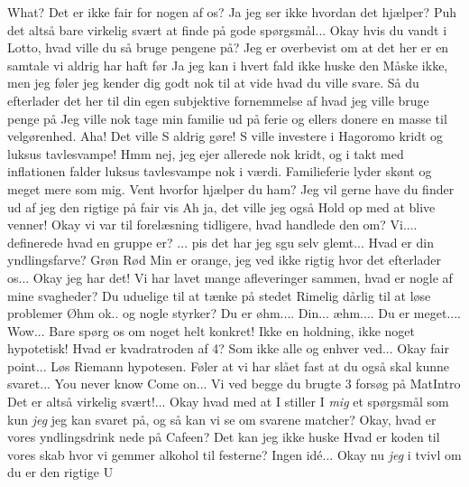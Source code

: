 \documentclass[a4paper,11pt]{article}
\begin{document}
\begin{sketch}
 What? Det er ikke fair for nogen af os?
 Ja jeg ser ikke hvordan det hjælper?
  Puh det altså bare virkelig svært at finde på gode spørgsmål... Okay hvis du vandt i Lotto, hvad ville du så bruge pengene på?
 Jeg er overbevist om at det her er en samtale vi aldrig har haft før
 Ja jeg kan i hvert fald ikke huske den
 Måske ikke, men jeg føler jeg kender dig godt nok til at vide hvad du ville svare.
 Så du efterlader det her til din egen subjektive fornemmelse af hvad jeg ville bruge penge på
 Jeg ville nok tage min familie ud på ferie og ellers donere en masse til velgørenhed.
 Aha! Det ville S aldrig gøre! S ville investere i Hagoromo kridt og luksus tavlesvampe!
 Hmm nej, jeg ejer allerede nok kridt, og i takt med inflationen falder luksus tavlesvampe nok i værdi. Familieferie lyder skønt og meget mere som mig.
 Vent hvorfor hjælper du ham?
 Jeg vil gerne have du finder ud af jeg den rigtige på fair vis
 Ah ja, det ville jeg også
 Hold op med at blive venner! Okay vi var til forelæsning tidligere, hvad handlede den om?
 Vi.... definerede hvad en gruppe er?
... pis det har jeg sgu selv glemt... Hvad er din yndlingsfarve?
 Grøn
 Rød
 Min er orange, jeg ved ikke rigtig hvor det efterlader os... Okay jeg har det! Vi har lavet mange afleveringer sammen, hvad er nogle af mine svagheder?
 Du uduelige til at tænke på stedet
 Rimelig dårlig til at løse problemer
  Øhm ok.. og nogle styrker?
 Du er øhm.... 
 Din... æhm.... Du er meget....
 Wow...
 Bare spørg os om noget helt konkret! Ikke en holdning, ikke noget hypotetisk!
 Hvad er kvadratroden af 4?
 Som ikke alle og enhver ved...
 Okay fair point... Løs Riemann hypotesen.
 Føler at vi har slået fast at du også skal kunne svaret...
 You never know
 Come on... Vi ved begge du brugte 3 forsøg på MatIntro
 Det er altså virkelig svært!... Okay hvad med at I stiller I \textit{mig} et spørgsmål som kun \textit{jeg} jeg kan svaret på, og så kan vi se om svarene matcher?
 Okay, hvad er vores yndlingsdrink nede på Cafeen?
 Det kan jeg ikke huske
 Hvad er koden til vores skab hvor vi gemmer alkohol til festerne?
 Ingen idé...
 Okay nu \textit{jeg} i tvivl om du er den rigtige U

\end{sketch}
\end{document}
